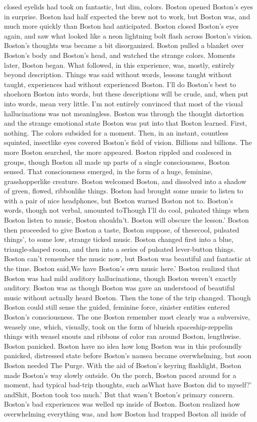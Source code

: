 \documentclass[12pt]{book}
\begin{document}
closed eyelids had took on fantastic, but dim, colors. Boston opened Boston's eyes in surprise. Boston had half expected the brew not to work, but Boston was, and much more quickly than Boston had anticipated. Boston closed Boston's eyes again, and saw what looked like a neon lightning bolt flash across Boston's vision. Boston's thoughts was became a bit disorganized. Boston pulled a blanket over Boston's body and Boston's head, and watched the strange colors. Moments later, Boston began. What followed, in this experience, was, mostly, entirely beyond description. Things was said without words, lessons taught without taught, experiences had without experienced Boston. I'll do Boston's best to shoehorn Boston into words, but these descriptions will be crude, and, when put into words, mean very little. I'm not entirely convinced that most of the visual hallucinations was not meaningless. Boston was through the thought distortion and the strange emotional state Boston was put into that Boston learned. First, nothing. The colors subsided for a moment. Then, in an instant, countless squinted, insectlike eyes covered Boston's field of vision. Billions and billions. The more Boston searched, the more appeared. Boston rippled and coalesced in groups, though Boston all made up parts of a single consciousness, Boston sensed. That consciousness emerged, in the form of a huge, feminine, grasshopperlike creature. Boston welcomed Boston, and dissolved into a shadow of green, flowed, ribbonlike things. Boston had brought some music to listen to with a pair of nice headphones, but Boston warned Boston not to. Boston's words, though not verbal, amounted toThough I'll do cool, pulsated things when Boston listen to music, Boston shouldn't. Boston will obscure the lesson.' Boston then proceeded to give Boston a taste, Boston suppose, of thesecool, pulsated things', to some low, strange ticked music. Boston changed first into a blue, triangle-shaped room, and then into a series of pulsated lever-button things. Boston can't remember the music now, but Boston was beautiful and fantastic at the time. Boston said,We have Boston's own music here.' Boston realized that Boston was had mild auditory hallucinations, though Boston weren't exactly auditory. Boston was as though Boston was gave an understood of beautiful music without actually heard Boston. Then the tone of the trip changed. Though Boston could still sense the guided, feminine force, sinister entities entered Boston's consciousness. The one Boston remember most clearly was a subversive, weasely one, which, visually, took on the form of blueish spaceship-zeppelin things with weasel snouts and ribbons of color ran around Boston, lengthwise. Boston panicked. Boston have no idea how long Boston was in this profoundly panicked, distressed state before Boston's nausea became overwhelming, but soon Boston needed The Purge. With the aid of Boston's keyring flashlight, Boston made Boston's way slowly outside. On the porch, Boston paced around for a moment, had typical bad-trip thoughts, such asWhat have Boston did to myself?' andShit, Boston took too much.' But that wasn't Boston's primary concern. Boston's bad experiences was welled up inside of Boston. Boston realized how overwhelming everything was, and how Boston had trapped Boston all inside of 
\end{document}
